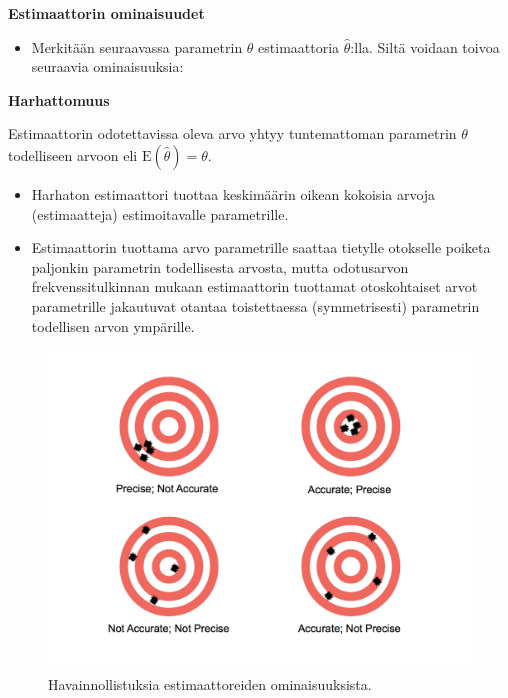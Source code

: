 \documentclass[
]{book}
\providecommand{\tightlist}{%
  \setlength{\itemsep}{0pt}\setlength{\parskip}{0pt}}
\begin{document}
\hfill\break
\FloatBarrier
\textbf{Estimaattorin ominaisuudet}

\begin{itemize}
\tightlist
\item
  Merkitään seuraavassa parametrin \(\theta\) estimaattoria \(\widehat{\theta}\):lla. Siltä voidaan toivoa seuraavia ominaisuuksia:
\end{itemize}

\begin{defblock}{}

\textbf{Harhattomuus}

Estimaattorin odotettavissa oleva arvo yhtyy tuntemattoman parametrin \(\theta\) todelliseen arvoon eli \(\text{E}(\widehat{\theta}) = \theta\).

\begin{itemize}
\tightlist
\item
  Harhaton estimaattori tuottaa keskimäärin oikean kokoisia arvoja (estimaatteja) estimoitavalle parametrille.
\item
  Estimaattorin tuottama arvo parametrille saattaa tietylle otokselle poiketa paljonkin parametrin todellisesta arvosta, mutta odotusarvon frekvenssitulkinnan mukaan estimaattorin tuottamat otoskohtaiset arvot parametrille jakautuvat otantaa toistettaessa (symmetrisesti) parametrin todellisen arvon ympärille.
\end{itemize}

\end{defblock}

\begin{figure}

{\centering \includegraphics[width=1\linewidth]{images/unbiased} 

}

\caption{Havainnollistuksia estimaattoreiden ominaisuuksista.}\label{fig:unbiased}
\end{figure}
\end{document}
